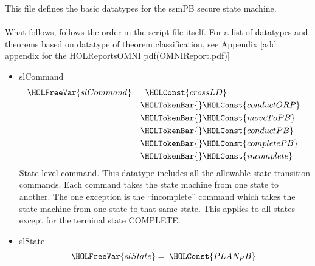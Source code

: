 This file defines the basic datatypes for the ssmPB secure state machine.\\\\
What follows, follows the order in the script file itself. For a list of datatypes
and theorems based on datatype of theorem classification, see Appendix [add appendix
for the HOLReportsOMNI pdf(OMNIReport.pdf)]

  \begin{itemize}
  \item slCommand
   \begin{align*}
      \HOLFreeVar{slCommand} =&\;\; \HOLConst{crossLD}\ \\
      &\HOLTokenBar{} \HOLConst{conductORP}\ \\
      &\HOLTokenBar{} \HOLConst{moveToPB}\ \\
      &\HOLTokenBar{} \HOLConst{conductPB}\ \\
      &\HOLTokenBar{} \HOLConst{completePB}\ \\
      &\HOLTokenBar{} \HOLConst{incomplete}
    \end{align*}
  State-level command. This datatype includes all the allowable state
    transition commands. Each command takes the state machine from one state to
    another. The one exception is the “incomplete” command which takes the state
    machine from one state to that same state. This applies to all states except
    for the terminal state COMPLETE.
    \item slState
      \begin{align*}
        \HOLFreeVar{slState} =&\;\; \HOLConst{PLAN_PB}\ \\

\end{align*}
\end{itemize}
